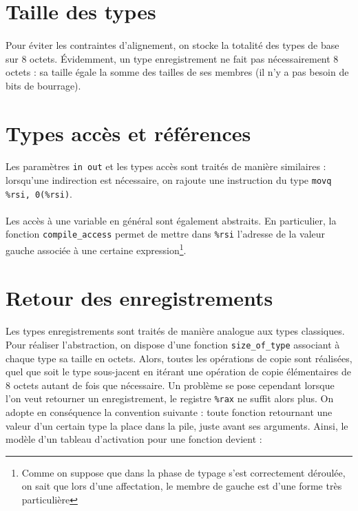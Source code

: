 \documentclass[a4paper,12pt]{article}
\begin{document}
\section{Taille des types}

\paragraph*{}
Pour éviter les contraintes d'alignement, on stocke la totalité des types de base sur 8 octets. Évidemment, un type
enregistrement ne fait pas nécessairement 8 octets : sa taille égale la somme des tailles de ses membres (il n'y a pas
besoin de bits de bourrage).

\section{Types accès et références}

\paragraph*{}
Les paramètres \texttt{in out} et les types accès sont traités de manière similaires : lorsqu'une indirection est nécessaire,
on rajoute une instruction du type \texttt{movq \%rsi, 0(\%rsi)}.

\paragraph*{}
Les accès à une variable en général sont également abstraits. En particulier, la fonction \texttt{compile\_access} permet
de mettre dans \texttt{\%rsi} l'adresse de la valeur gauche associée à une certaine expression\footnote{Comme on suppose que
dans la phase de typage s'est correctement déroulée, on sait que lors d'une affectation, le membre de gauche est d'une
forme très particulière}.

\section{Retour des enregistrements}

\paragraph*{}
Les types enregistrements sont traités de manière analogue aux types classiques. Pour réaliser l'abstraction, on dispose d'une fonction \texttt{size\_of\_type}
associant à chaque type sa taille en octets. Alors, toutes les opérations de copie sont réalisées, quel que soit le type sous-jacent en itérant une opération
de copie élémentaires de 8 octets autant de fois que nécessaire. Un problème se pose cependant lorsque l'on veut retourner un enregistrement, le registre
\texttt{\%rax} ne suffit alors plus. On adopte en conséquence la convention suivante : toute fonction retournant une valeur d'un certain type la place dans la pile,
juste avant ses arguments. Ainsi, le modèle d'un tableau d'activation pour une fonction devient :
\end{document}
